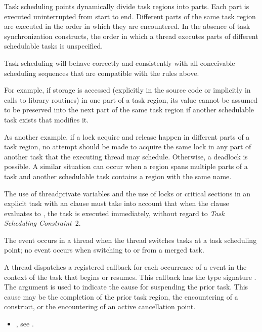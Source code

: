 \begin{note}
Task scheduling points dynamically divide task regions into parts. Each part is
executed uninterrupted from start to end. Different parts of the same task region are
executed in the order in which they are encountered. In the absence of task
synchronization constructs, the order in which a thread executes parts of different
schedulable tasks is unspecified.

Task scheduling will behave correctly and consistently with all conceivable
scheduling sequences that are compatible with the rules above.

For example, if  storage is accessed (explicitly in the source code or
implicitly in calls to library routines) in one part of a task region, its value cannot be
assumed to be preserved into the next part of the same task region if another schedulable
task exists that modifies it.

As another example, if a lock acquire and release happen in different parts of a task
region, no attempt should be made to acquire the same lock in any part of another task
that the executing thread may schedule. Otherwise, a deadlock is possible. A similar
situation can occur when a  region spans multiple parts of a task and another
schedulable task contains a  region with the same name.

The use of threadprivate variables and the use of locks or critical sections in an explicit
task with an  clause must take into account that when the  clause evaluates to
, the task is executed immediately, without regard to \emph{Task Scheduling Constraint}~2.
\end{note}

\events

The  event occurs in a thread when the thread switches tasks at a task scheduling point;
no event occurs when switching to or from a merged task.

\tools

A thread dispatches a registered 
callback for each occurrence of a  event in
the context of the task that begins or resumes. This callback has the type signature
.
The argument   is used to indicate the cause for suspending the prior task.
This cause may be the completion of the prior task region, the encountering of a
 construct, or the encountering of an active cancellation point.

\crossreferences
\begin{itemize}
\item {}, see
.
\end{itemize}
